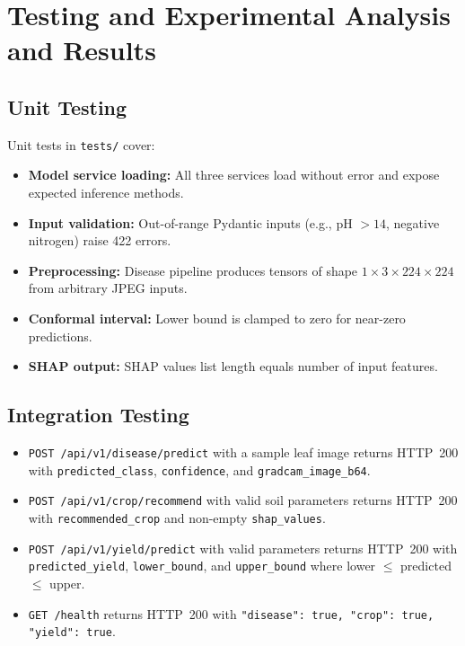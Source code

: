 \documentclass[12pt,a4paper]{report}
\begin{document}
\chapter{Testing and Experimental Analysis and Results}

\section{Unit Testing}
Unit tests in \texttt{tests/} cover:
\begin{itemize}[leftmargin=*]
  \item \textbf{Model service loading:} All three services load without error and expose expected inference methods.
  \item \textbf{Input validation:} Out-of-range Pydantic inputs (e.g., pH $>14$, negative nitrogen) raise 422 errors.
  \item \textbf{Preprocessing:} Disease pipeline produces tensors of shape $1\times3\times224\times224$ from arbitrary JPEG inputs.
  \item \textbf{Conformal interval:} Lower bound is clamped to zero for near-zero predictions.
  \item \textbf{SHAP output:} SHAP values list length equals number of input features.
\end{itemize}

\section{Integration Testing}
\begin{itemize}[leftmargin=*]
  \item \texttt{POST /api/v1/disease/predict} with a sample leaf image returns HTTP~200 with \texttt{predicted\_class}, \texttt{confidence}, and \texttt{gradcam\_image\_b64}.
  \item \texttt{POST /api/v1/crop/recommend} with valid soil parameters returns HTTP~200 with \texttt{recommended\_crop} and non-empty \texttt{shap\_values}.
  \item \texttt{POST /api/v1/yield/predict} with valid parameters returns HTTP~200 with \texttt{predicted\_yield}, \texttt{lower\_bound}, and \texttt{upper\_bound} where lower $\leq$ predicted $\leq$ upper.
  \item \texttt{GET /health} returns HTTP~200 with \texttt{"disease": true, "crop": true, "yield": true}.
\end{itemize}
\end{document}
